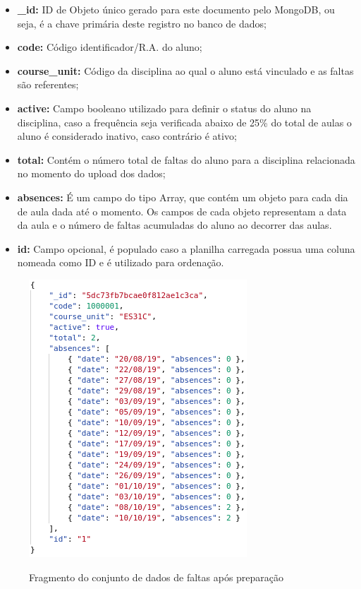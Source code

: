 \begin{itemize}[topsep=5pt]
    \item \textbf{\_id:} ID de Objeto único gerado para este documento pelo MongoDB, ou seja, é a chave primária deste registro no banco de dados;
    \item \textbf{code:} Código identificador/R.A. do aluno; 
    \item \textbf{course\_unit:} Código da disciplina ao qual o aluno está vinculado e as faltas são referentes;  
    \item \textbf{active:} Campo booleano utilizado para definir o status do aluno na disciplina, caso a frequência seja verificada abaixo de 25\% do total de aulas o aluno é considerado inativo, caso contrário é ativo;
    \item \textbf{total:} Contém o número total de faltas do aluno para a disciplina relacionada no momento do upload dos dados; 
    \item \textbf{absences:} É um campo do tipo Array, que contém um objeto para cada dia de aula dada até o momento. Os campos de cada objeto representam a data da aula e o número de faltas acumuladas do aluno ao decorrer das aulas.
    \item \textbf{id:} Campo opcional, é populado caso a planilha carregada possua uma coluna nomeada como ID e é utilizado para ordenação.
\end{itemize}

\begin{figure}[!htb]
    \centering
    \caption{Fragmento do conjunto de dados de faltas após preparação}
    \includegraphics[height=0.65\textwidth]{./dados/figuras/dados-faltas-pos}
    \label{fig:dados-faltas-pos}
\end{figure}

